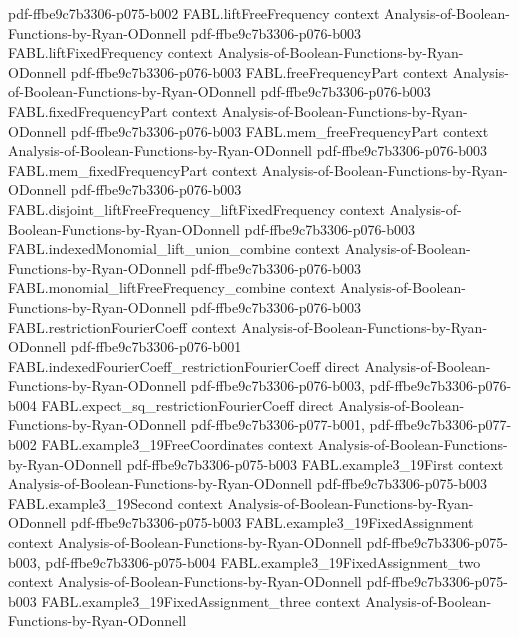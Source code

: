 \begin{theorem}
  {pdf-ffbe9c7b3306-p075-b002}
\proofstep
  {FABL.liftFreeFrequency}
  {context}
  {Analysis-of-Boolean-Functions-by-Ryan-ODonnell}
  {pdf-ffbe9c7b3306-p076-b003}
\proofstep
  {FABL.liftFixedFrequency}
  {context}
  {Analysis-of-Boolean-Functions-by-Ryan-ODonnell}
  {pdf-ffbe9c7b3306-p076-b003}
\proofstep
  {FABL.freeFrequencyPart}
  {context}
  {Analysis-of-Boolean-Functions-by-Ryan-ODonnell}
  {pdf-ffbe9c7b3306-p076-b003}
\proofstep
  {FABL.fixedFrequencyPart}
  {context}
  {Analysis-of-Boolean-Functions-by-Ryan-ODonnell}
  {pdf-ffbe9c7b3306-p076-b003}
\proofstep
  {FABL.mem_freeFrequencyPart}
  {context}
  {Analysis-of-Boolean-Functions-by-Ryan-ODonnell}
  {pdf-ffbe9c7b3306-p076-b003}
\proofstep
  {FABL.mem_fixedFrequencyPart}
  {context}
  {Analysis-of-Boolean-Functions-by-Ryan-ODonnell}
  {pdf-ffbe9c7b3306-p076-b003}
\proofstep
  {FABL.disjoint_liftFreeFrequency_liftFixedFrequency}
  {context}
  {Analysis-of-Boolean-Functions-by-Ryan-ODonnell}
  {pdf-ffbe9c7b3306-p076-b003}
\proofstep
  {FABL.indexedMonomial_lift_union_combine}
  {context}
  {Analysis-of-Boolean-Functions-by-Ryan-ODonnell}
  {pdf-ffbe9c7b3306-p076-b003}
\proofstep
  {FABL.monomial_liftFreeFrequency_combine}
  {context}
  {Analysis-of-Boolean-Functions-by-Ryan-ODonnell}
  {pdf-ffbe9c7b3306-p076-b003}
\proofstep
  {FABL.restrictionFourierCoeff}
  {context}
  {Analysis-of-Boolean-Functions-by-Ryan-ODonnell}
  {pdf-ffbe9c7b3306-p076-b001}
\proofstep
  {FABL.indexedFourierCoeff_restrictionFourierCoeff}
  {direct}
  {Analysis-of-Boolean-Functions-by-Ryan-ODonnell}
  {pdf-ffbe9c7b3306-p076-b003,
    pdf-ffbe9c7b3306-p076-b004}
\proofstep
  {FABL.expect_sq_restrictionFourierCoeff}
  {direct}
  {Analysis-of-Boolean-Functions-by-Ryan-ODonnell}
  {pdf-ffbe9c7b3306-p077-b001,
    pdf-ffbe9c7b3306-p077-b002}
\proofstep
  {FABL.example3_19FreeCoordinates}
  {context}
  {Analysis-of-Boolean-Functions-by-Ryan-ODonnell}
  {pdf-ffbe9c7b3306-p075-b003}
\proofstep
  {FABL.example3_19First}
  {context}
  {Analysis-of-Boolean-Functions-by-Ryan-ODonnell}
  {pdf-ffbe9c7b3306-p075-b003}
\proofstep
  {FABL.example3_19Second}
  {context}
  {Analysis-of-Boolean-Functions-by-Ryan-ODonnell}
  {pdf-ffbe9c7b3306-p075-b003}
\proofstep
  {FABL.example3_19FixedAssignment}
  {context}
  {Analysis-of-Boolean-Functions-by-Ryan-ODonnell}
  {pdf-ffbe9c7b3306-p075-b003,
    pdf-ffbe9c7b3306-p075-b004}
\proofstep
  {FABL.example3_19FixedAssignment_two}
  {context}
  {Analysis-of-Boolean-Functions-by-Ryan-ODonnell}
  {pdf-ffbe9c7b3306-p075-b003}
\proofstep
  {FABL.example3_19FixedAssignment_three}
  {context}
  {Analysis-of-Boolean-Functions-by-Ryan-ODonnell}

\end{theorem}
